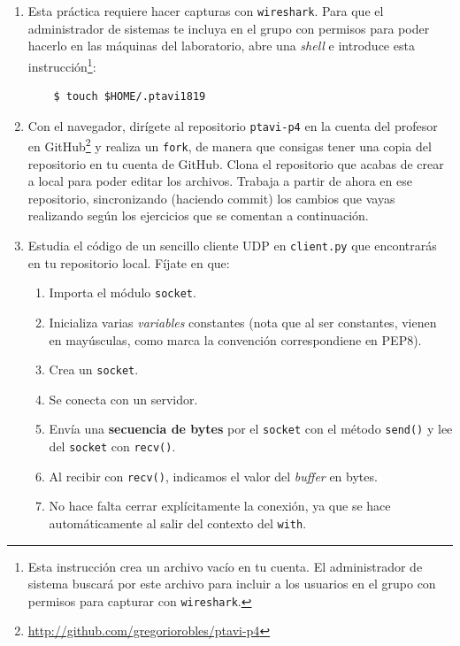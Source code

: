 \documentclass[11pt,a4paper]{article}
\begin{document}
\begin{enumerate}

  \item Esta práctica requiere hacer capturas con \texttt{wireshark}. Para que el administrador de sistemas te incluya en el grupo con permisos para poder hacerlo en las máquinas del laboratorio, abre una \emph{shell} e introduce esta instrucción\footnote{Esta instrucción crea un archivo vacío en tu cuenta. El administrador de sistema buscará por este archivo para incluir a los usuarios en el grupo con permisos para capturar con \texttt{wireshark}.}:
    \begin{verbatim}
	$ touch $HOME/.ptavi1819
    \end{verbatim}

  \item Con el navegador, dirígete al repositorio \texttt{ptavi-p4} en la cuenta del profesor en GitHub\footnote{\url{http://github.com/gregoriorobles/ptavi-p4}} y realiza un \texttt{fork}, de manera que consigas tener una copia del repositorio en tu cuenta de GitHub. Clona el repositorio que acabas de crear a local para poder editar los archivos. Trabaja a partir de ahora en ese repositorio, sincronizando (haciendo commit) los cambios que vayas realizando según los ejercicios que se comentan a continuación.

  \item Estudia el código de un sencillo cliente UDP en \texttt{client.py} que encontrarás en tu repositorio local. Fíjate en que:
  \begin{enumerate}
    \item Importa el módulo \texttt{socket}.
    \item Inicializa varias \emph{variables} constantes (nota que al ser constantes, vienen en mayúsculas, como marca la convención correspondiene en PEP8).
    \item Crea un \texttt{socket}.
    \item Se conecta con un servidor.
    \item Envía una {\bf secuencia de bytes} por el \texttt{socket} con el método \texttt{send()} y lee del \texttt{socket} con \texttt{recv()}.
    \item Al recibir con \texttt{recv()}, indicamos el valor del \emph{buffer} en bytes.
    \item No hace falta cerrar explícitamente la conexión, ya que se hace automáticamente al salir del contexto del \texttt{with}.
  \end{enumerate}



\end{enumerate}
\end{document}
